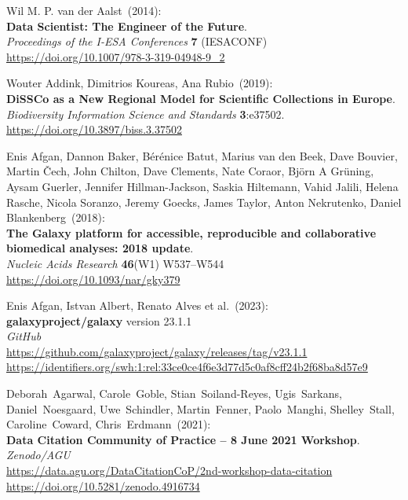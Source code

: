 
\makeatletter
{}

\begin{thebibliography}{9}

\small

Wil M. P. van der Aalst~(2014):\\
\textbf{Data Scientist: The Engineer of the Future}.\\
\emph{Proceedings of the I-ESA Conferences} \textbf{7} (IESACONF) \\
\url{https://doi.org/10.1007/978-3-319-04948-9_2}

Wouter Addink, Dimitrios Koureas, Ana Rubio~(2019): \\
\textbf{DiSSCo as a New Regional Model for Scientific Collections in Europe}.\\
\emph{Biodiversity Information Science and Standards}
\textbf{3}:e37502.\\
\url{https://doi.org/10.3897/biss.3.37502}

Enis Afgan, Dannon Baker, Bérénice Batut, Marius van den Beek, Dave Bouvier, Martin Čech, John Chilton, Dave Clements, Nate Coraor, Björn A Grüning, Aysam Guerler, Jennifer Hillman-Jackson, Saskia Hiltemann, Vahid Jalili, Helena Rasche, Nicola Soranzo, Jeremy Goecks, James Taylor, Anton Nekrutenko, Daniel Blankenberg~(2018): \\
\textbf{The Galaxy platform for accessible, reproducible and collaborative biomedical analyses: 2018 update}.\\
\emph{Nucleic Acids Research} \textbf{46}(W1) W537--W544\\
\url{https://doi.org/10.1093/nar/gky379}

Enis Afgan, Istvan Albert, Renato Alves et al.~(2023): \\
\textbf{galaxyproject/galaxy} version 23.1.1\\
\emph{GitHub}\\
\url{https://github.com/galaxyproject/galaxy/releases/tag/v23.1.1}\\
\url{https://identifiers.org/swh:1:rel:33ce0ce4f6e3d77d5c0af8cff24b2f68ba8d57e9}

Deborah~Agarwal, Carole~Goble, Stian~Soiland-Reyes, Ugis~Sarkans, Daniel~Noesgaard, Uwe~Schindler, Martin~Fenner, Paolo~Manghi, Shelley~Stall, Caroline~Coward, Chris~Erdmann~(2021): \\
\textbf{Data Citation Community of Practice -- 8 June 2021 Workshop}.\\
\emph{Zenodo/AGU}\\
\url{https://data.agu.org/DataCitationCoP/2nd-workshop-data-citation}\\
\url{https://doi.org/10.5281/zenodo.4916734}


\end{thebibliography}
